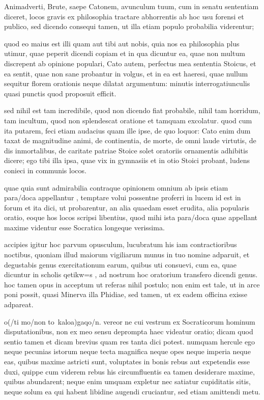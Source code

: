 
 Animadverti, Brute, saepe Catonem, avunculum tuum, cum in senatu sententiam diceret, locos gravis ex philosophia tractare abhorrentis ab hoc usu forensi et publico, sed dicendo consequi tamen, ut illa etiam populo probabilia viderentur;

 quod eo maius est illi quam aut tibi aut nobis, quia nos ea philosophia plus utimur, quae peperit dicendi copiam et in qua dicuntur ea, quae non multum discrepent ab opinione populari, Cato autem, perfectus mea sententia Stoicus, et ea sentit, quae non sane probantur in volgus, et in ea est haeresi, quae nullum sequitur florem orationis neque dilatat argumentum: minutis interrogatiunculis quasi punctis quod proposuit efficit.

 sed nihil est tam incredibile, quod non dicendo fiat probabile, nihil tam horridum, tam incultum, quod non splendescat oratione et tamquam excolatur. quod cum ita putarem, feci etiam audacius quam ille ipse, de quo loquor: Cato enim dum taxat de magnitudine animi, de continentia, de morte, de omni laude virtutis, de dis inmortalibus, de caritate patriae Stoice solet oratoriis ornamentis adhibitis dicere; ego tibi illa ipsa, quae vix in gymnasiis et in otio Stoici probant, ludens conieci in communis locos.

 quae quia sunt admirabilia contraque opinionem omnium ab ipsis etiam para/doca appellantur , temptare volui possentne proferri in lucem id est in forum et ita dici, ut probarentur, an alia quaedam esset erudita, alia popularis oratio, eoque hos locos scripsi libentius, quod mihi ista para/doca quae appellant maxime videntur esse Socratica longeque verissima.

 accipies igitur hoc parvum opusculum, lucubratum his iam contractioribus noctibus, quoniam illud maiorum vigiliarum munus in tuo nomine adparuit, et degustabis genus exercitationum earum, quibus uti consuevi, cum ea, quae dicuntur in scholis qetikw=s , ad nostrum hoc oratorium transfero dicendi genus. hoc tamen opus in acceptum ut referas nihil postulo; non enim est tale, ut in arce poni possit, quasi Minerva illa Phidiae, sed tamen, ut ex eadem officina exisse adpareat.

 o(/ti mo/non to\ kalo\n a)gaqo/n. vereor ne cui vestrum ex Socraticorum hominum disputationibus, non ex meo sensu deprompta haec videatur oratio; dicam quod sentio tamen et dicam brevius quam res tanta dici potest. numquam hercule ego neque pecunias istorum neque tecta magnifica neque opes neque imperia neque eas, quibus maxime astricti sunt, voluptates in bonis rebus aut expetendis esse duxi, quippe cum viderem rebus his circumfluentis ea tamen desiderare maxime, quibus abundarent; neque enim umquam expletur nec satiatur cupiditatis sitis, neque solum ea qui habent libidine augendi cruciantur, sed etiam amittendi metu.

